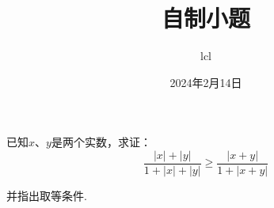 \documentclass[11pt]{article}
\title{自制小题}
\date{2024年2月14日}
\author{lcl}
\begin{document}
\maketitle
已知$x$、$y$是两个实数，求证：$$\frac{|x|+|y|}{1+|x|+|y|} \geq \frac{|x+y|}{1+|x+y|}$$ \par
并指出取等条件.
\end{document}
